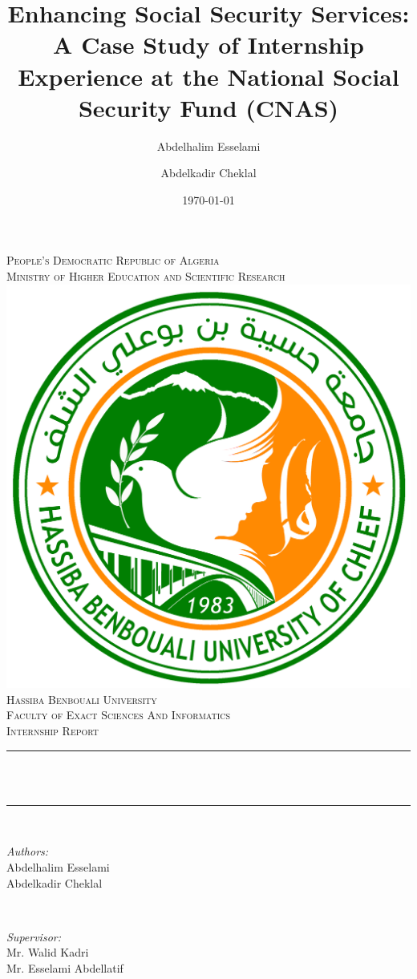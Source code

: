 \documentclass[12pt]{report}
\title{\Large Enhancing Social Security Services: A Case Study of Internship Experience at the National Social Security Fund (CNAS)}
\begin{document}
\author{Abdelhalim Esselami \and Abdelkadir Cheklal}
\date{\today}
\begin{titlepage}
    \centering
    \textsc{\Large People's Democratic Republic of Algeria}\\[0.2cm]  %
    \textsc{\Large Ministry of Higher Education and Scientific Research}\\[0.8cm]  %
    \vspace*{0.5cm}
    \includegraphics[scale=0.2]{university-logo.png}\\[1.0cm]	%
    \textsc{\LARGE Hassiba Benbouali University}\\[0.5cm]
	\textsc{\LARGE Faculty of Exact Sciences And Informatics}\\[1.5cm]	%
    \textsc{\Large Internship Report}\\[0.5cm]				%
    
    
	\rule{\linewidth}{0.2mm} \\[0.4cm]
	{\huge \bfseries \thetitle \\[0.4cm] }
	\rule{\linewidth}{0.2mm} \\[1.5cm]
	
	\begin{minipage}{0.4\textwidth}
		\begin{flushleft} \large
			\emph{Authors:}\\
			Abdelhalim Esselami \\
			Abdelkadir Cheklal
		\end{flushleft}
	\end{minipage}~
	\begin{minipage}{0.4\textwidth}
		\begin{flushright} \large
			\emph{Supervisor:} \\
			Mr. Walid Kadri\\
			Mr. Esselami Abdellatif								%
		\end{flushright}
	\end{minipage}\\[2cm]
	

\end{titlepage}
\end{document}
